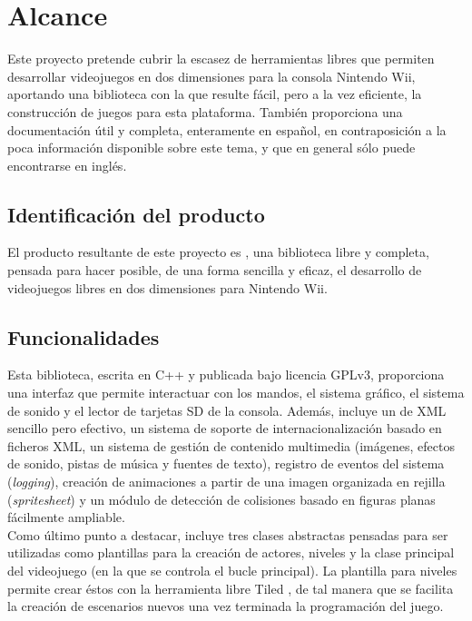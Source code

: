 \section{Alcance}

Este proyecto pretende cubrir la escasez de herramientas libres que permiten desarrollar videojuegos en dos dimensiones para la consola Nintendo Wii, aportando una biblioteca con la que resulte fácil, pero a la vez eficiente, la construcción de juegos para esta plataforma. También proporciona una documentación útil y completa, enteramente en español, en contraposición a la poca información disponible sobre este tema, y que en general sólo puede encontrarse en inglés.

\subsection{Identificación del producto}

El producto resultante de este proyecto es , una biblioteca libre y completa, pensada para hacer posible, de una forma sencilla y eficaz, el desarrollo de videojuegos libres en dos dimensiones para Nintendo Wii.

\subsection{Funcionalidades}

Esta biblioteca, escrita en C++ \cite{abur01} y publicada bajo licencia GPLv3, proporciona una interfaz que permite interactuar con los mandos, el sistema gráfico, el sistema de sonido y el lector de tarjetas SD de la consola. Además, incluye un  de XML sencillo pero efectivo, un sistema de soporte de internacionalización basado en ficheros XML, un sistema de gestión de contenido multimedia (imágenes, efectos de sonido, pistas de música y fuentes de texto), registro de eventos del sistema (\emph{logging}), creación de animaciones a partir de una imagen organizada en rejilla (\emph{spritesheet}) y un módulo de detección de colisiones basado en figuras planas fácilmente ampliable.\\

Como último punto a destacar,  incluye tres clases abstractas pensadas para ser utilizadas como plantillas para la creación de actores, niveles y la clase principal del videojuego (en la que se controla el bucle principal). La plantilla para niveles permite crear éstos con la herramienta libre Tiled \cite{website:tiled}, de tal manera que se facilita la creación de escenarios nuevos una vez terminada la programación del juego.\\

